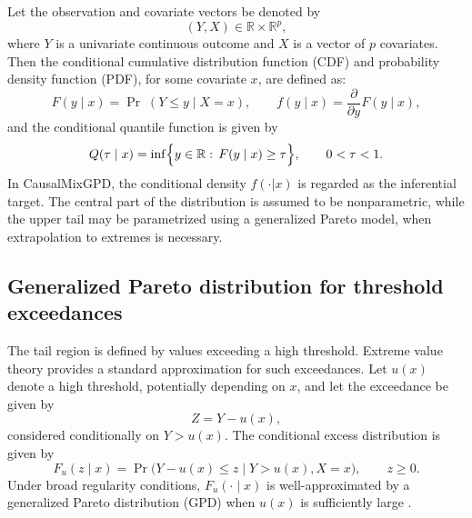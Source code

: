 \documentclass[preprint,12pt,authoryear]{elsarticle}
\newcommand{\pkg}[1]{\textsf{#1}}
\begin{document}
Let the observation and covariate vectors be denoted by
\begin{equation*}
(Y,X) \in \mathbb{R}\times \mathbb{R}^p,
\end{equation*}
where $Y$ is a univariate continuous outcome and $X$ is a vector of $p$ covariates.
Then the conditional cumulative distribution function (CDF) and probability density function (PDF), for some covariate $x$, are defined as:
\begin{equation*}
F(y\mid x)=\Pr\;(Y\le y\mid X=x),
\qquad
f(y\mid x)=\frac{\partial}{\partial y}F(y\mid x),
\end{equation*}
and the conditional quantile function is given by
\begin{equation*}
Q(\tau\mid x)=\inf\Bigl\{y\in\mathbb{R}:\,F(y\mid x)\ge \tau\Bigr\},
\qquad 0<\tau<1.
\end{equation*}
In \pkg{CausalMixGPD}, the conditional density $f(\cdot|x)$ is regarded as the inferential target.
The central part of the distribution is assumed to be nonparametric, while
the upper tail may be parametrized using a generalized Pareto model, when
extrapolation to extremes is necessary.


\subsection{Generalized Pareto distribution for threshold exceedances}
\label{subsec:gpd}

The tail region is defined by values exceeding a high threshold.
Extreme value theory provides a standard approximation for such
exceedances.  Let $u(x)$ denote a high threshold, potentially
depending on $x$, and let the exceedance be given by
\begin{equation*}
Z = Y - u(x),
\end{equation*}
considered conditionally on $Y > u(x)$.  The conditional excess
distribution is given by
\begin{equation*}
F_u(z\mid x) = \Pr\!\bigl(Y-u(x) \le z \mid Y>u(x), X=x\bigr),
\qquad z \ge 0.
\end{equation*}
Under broad regularity conditions, $F_u(\cdot\mid x)$ is
well-approximated by a generalized Pareto distribution (GPD) when
$u(x)$ is sufficiently large
\citep{BalkemaDeHaan1974,Pickands1975,Coles2001}.
\end{document}
